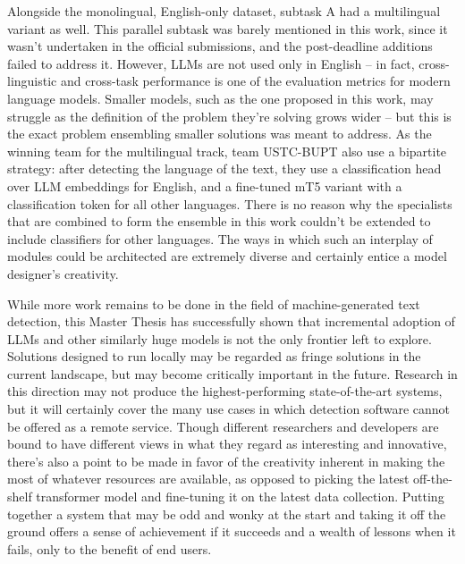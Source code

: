 Alongside the monolingual, English-only dataset, subtask A had a multilingual variant as well.
This parallel subtask was barely mentioned in this work, since it wasn't undertaken in the official submissions, and the post-deadline additions failed to address it.
However, LLMs are not used only in English -- in fact, cross-linguistic and cross-task performance is one of the evaluation metrics for modern language models.
Smaller models, such as the one proposed in this work, may struggle as the definition of the problem they're solving grows wider -- but this is the exact problem ensembling smaller solutions was meant to address.
As the winning team for the multilingual track, team USTC-BUPT \citep{guo2024ustc} also use a bipartite strategy: after detecting the language of the text, they use a classification head over LLM embeddings for English, and a fine-tuned mT5 variant with a classification token for all other languages.
There is no reason why the specialists that are combined to form the ensemble in this work couldn't be extended to include classifiers for other languages.
The ways in which such an interplay of modules could be architected are extremely diverse and certainly entice a model designer's creativity.

While more work remains to be done in the field of machine-generated text detection, this Master Thesis has successfully shown that incremental adoption of LLMs and other similarly huge models is not the only frontier left to explore.
Solutions designed to run locally may be regarded as fringe solutions in the current landscape, but may become critically important in the future.
Research in this direction may not produce the highest-performing state-of-the-art systems, but it will certainly cover the many use cases in which detection software cannot be offered as a remote service.
Though different researchers and developers are bound to have different views in what they regard as interesting and innovative, there's also a point to be made in favor of the creativity inherent in making the most of whatever resources are available, as opposed to picking the latest off-the-shelf transformer model and fine-tuning it on the latest data collection.
Putting together a system that may be odd and wonky at the start and taking it off the ground offers a sense of achievement if it succeeds and a wealth of lessons when it fails, only to the benefit of end users.